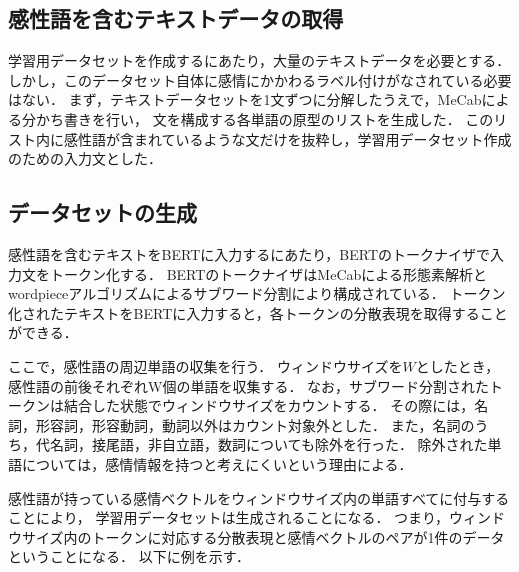		\subsection{感性語を含むテキストデータの取得}
			学習用データセットを作成するにあたり，大量のテキストデータを必要とする．
			しかし，このデータセット自体に感情にかかわるラベル付けがなされている必要はない．
			まず，テキストデータセットを1文ずつに分解したうえで，MeCabによる分かち書きを行い，
			文を構成する各単語の原型のリストを生成した．
			このリスト内に感性語が含まれているような文だけを抜粋し，学習用データセット作成のための入力文とした．

		\subsection{データセットの生成}
			感性語を含むテキストをBERTに入力するにあたり，BERTのトークナイザで入力文をトークン化する．
			BERTのトークナイザはMeCabによる形態素解析とwordpieceアルゴリズムによるサブワード分割により構成されている．
			トークン化されたテキストをBERTに入力すると，各トークンの分散表現を取得することができる．

			ここで，感性語の周辺単語の収集を行う．
			ウィンドウサイズを$W$としたとき，感性語の前後それぞれW個の単語を収集する．
			なお，サブワード分割されたトークンは結合した状態でウィンドウサイズをカウントする．
			その際には，名詞，形容詞，形容動詞，動詞以外はカウント対象外とした．
			また，名詞のうち，代名詞，接尾語，非自立語，数詞についても除外を行った．
			除外された単語については，感情情報を持つと考えにくいという理由による．

			感性語が持っている感情ベクトルをウィンドウサイズ内の単語すべてに付与することにより，
			学習用データセットは生成されることになる．
			つまり，ウィンドウサイズ内のトークンに対応する分散表現と感情ベクトルのペアが1件のデータ
			ということになる．
			以下に例を示す．

